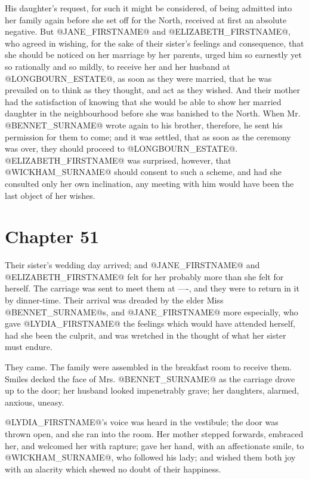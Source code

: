 His daughter's request, for such it might be considered, of being
admitted into her family again before she set off for the North,
received at first an absolute negative. But @JANE_FIRSTNAME@ and @ELIZABETH_FIRSTNAME@,
who agreed in wishing, for the sake of their sister's feelings and
consequence, that she should be noticed on her marriage by her parents,
urged him so earnestly yet so rationally and so mildly, to receive her
and her husband at @LONGBOURN_ESTATE@, as soon as they were married, that he was
prevailed on to think as they thought, and act as they wished. And their
mother had the satisfaction of knowing that she would be able to show
her married daughter in the neighbourhood before she was banished to the
North. When Mr. @BENNET_SURNAME@ wrote again to his brother, therefore, he sent
his permission for them to come; and it was settled, that as soon as
the ceremony was over, they should proceed to @LONGBOURN_ESTATE@. @ELIZABETH_FIRSTNAME@ was
surprised, however, that @WICKHAM_SURNAME@ should consent to such a scheme, and
had she consulted only her own inclination, any meeting with him would
have been the last object of her wishes.



\chapter*{Chapter 51}


Their sister's wedding day arrived; and @JANE_FIRSTNAME@ and @ELIZABETH_FIRSTNAME@ felt for her
probably more than she felt for herself. The carriage was sent to
meet them at ----, and they were to return in it by dinner-time. Their
arrival was dreaded by the elder Miss @BENNET_SURNAME@s, and @JANE_FIRSTNAME@ more especially,
who gave @LYDIA_FIRSTNAME@ the feelings which would have attended herself, had she
been the culprit, and was wretched in the thought of what her sister
must endure.

They came. The family were assembled in the breakfast room to receive
them. Smiles decked the face of Mrs. @BENNET_SURNAME@ as the carriage drove up to
the door; her husband looked impenetrably grave; her daughters, alarmed,
anxious, uneasy.

@LYDIA_FIRSTNAME@'s voice was heard in the vestibule; the door was thrown open, and
she ran into the room. Her mother stepped forwards, embraced her, and
welcomed her with rapture; gave her hand, with an affectionate smile,
to @WICKHAM_SURNAME@, who followed his lady; and wished them both joy with an
alacrity which shewed no doubt of their happiness.

